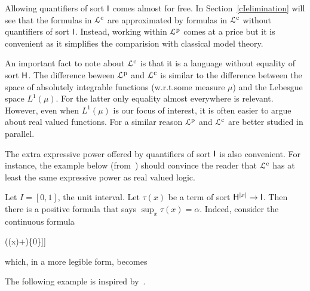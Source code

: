 \documentclass{amsproc}
\def\dotminus{\stackon[.2ex]{$-$}{$.$}}
\begin{document}
Allowing quantifiers of sort ${\sf I}$ comes almost for free.
In Section~\ref{cIelimination} will see that the formulas in ${\EuScript L}^{\rm c}$ are approximated by formulas in ${\EuScript L}^{\rm c}$ without quantifiers of sort ${\sf I}$.
Instead, working within ${\EuScript L}^{\rm p}$ comes at a price but it is convenient as it simplifies the comparision with classical model theory.

An important fact to note about ${\EuScript L}^{\rm c}$ is that it is a language without equality of sort ${\sf H}$.
The difference beween ${\EuScript L}^{\rm p}$ and ${\EuScript L}^{\rm c}$ is similar to the difference between the space of absolutely integrable functions (w.r.t.\@ some measure $\mu$) and the Lebesgue space $L^1(\mu)$.
For the latter only equality almost everywhere is relevant.
However, even when $L^1(\mu)$ is our focus of interest, it is often easier to argue about real valued functions.
For a similar reason ${\EuScript L}^{\rm p}$ and ${\EuScript L}^{\rm c}$ are better studied in parallel.

The extra expressive power offered by quantifiers of sort ${\sf I}$ is also convenient.
For instance, the example below (from~\cite{clcl}) should convince the reader that ${\EuScript L}^{\rm c}$ has at least the same expressive power as real valued logic.%

\begin{example}\label{ex_Rvlogic}
  Let $I=[0,1]$, the unit interval.
  Let $\tau(x)$ be a term of sort ${\sf H}^{|x|}\to {\sf I}$.
  Then there is a positive formula that says $\sup_x \tau(x)=\alpha$.
  Indeed, consider the continuous formula

  \ceq{\hfill\forall x\ \big[\tau(x)\dotminus\alpha\in\{0\}\big]}
  {\wedge}{\forall \varepsilon \Big[\varepsilon\in\{0\}\ \vee\ \exists x\ \big[\alpha\dotminus (\tau(x)+\varepsilon)\in\{0\}\big]\Big]}

  which, in a more legible form, becomes

\end{example}

The following example is inspired by~\cite{HPP}.
\end{document}
